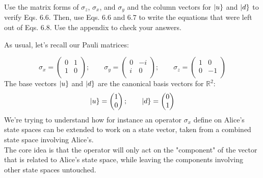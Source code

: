 \documentclass[solutions.tex]{subfiles}
\begin{document}
\maketitle
\begin{exercise} Use the matrix forms of $\sigma_z$, $\sigma_x$,
and $\sigma_y$ and the column vectors for $|u\}$ and $|d\}$
to verify Eqs. $6.6$. Then, use Eqs. $6.6$ and $6.7$ to write the
equations that were left out of Eqs. $6.8$. Use the appendix to
check your answers.
\end{exercise}
As usual, let's recall our Pauli matrices:

\[
	\sigma_x = \begin{pmatrix}
		0 & 1 \\
		1 & 0 \\
	\end{pmatrix};\qquad \sigma_y = \begin{pmatrix}
		0 & -i \\
		i & 0 \\
	\end{pmatrix};\qquad \sigma_z = \begin{pmatrix}
		1 & 0 \\
		0 & -1 \\
	\end{pmatrix}
\]
The base vectors $|u\}$ and $|d\}$ are the canonical
basis vectors for $\mathbb{R}^2$:
\[
	|u\} = \begin{pmatrix} 1 \\ 0 \\ \end{pmatrix};\qquad
	|d\} = \begin{pmatrix} 0 \\ 1 \\ \end{pmatrix}
\]
We're trying to understand how for instance an operator $\sigma_x$
define on Alice's state spaces can be extended to work on a state
vector, taken from a combined state space involving Alice's. \\

The core idea is that the operator will only act on the "component"
of the vector that is related to Alice's state space, while leaving
the components involving other state spaces untouched. \\
\end{document}
